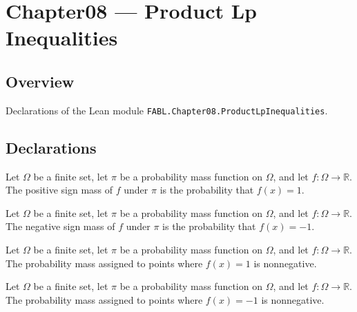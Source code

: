 \chapter{Chapter08 — Product Lp Inequalities}
\section{Overview}

Declarations of the Lean module \texttt{FABL.Chapter08.ProductLpInequalities}.

\section{Declarations}

\begin{definition}
\label{FABL.pmfSignPlusMass}
\leanok
{}
Let $Ω$ be a finite set, let $π$ be a probability mass function on $Ω$, and let
$f:Ω\to\mathbb R$. The positive sign mass of $f$ under $π$ is the probability that
$f(x)=1$.
\end{definition}

\begin{definition}
\label{FABL.pmfSignMinusMass}
\leanok
{}
Let $Ω$ be a finite set, let $π$ be a probability mass function on $Ω$, and let
$f:Ω\to\mathbb R$. The negative sign mass of $f$ under $π$ is the probability that
$f(x)=-1$.
\end{definition}

\begin{theorem}
\label{FABL.pmfSignPlusMass_nonneg}
\leanok
{}
Let $\Omega$ be a finite set, let $\pi$ be a probability mass function on $\Omega$, and
let $f:\Omega\to\mathbb{R}$. The probability mass assigned to points where $f(x)=1$ is
nonnegative.
\end{theorem}

\begin{theorem}
\label{FABL.pmfSignMinusMass_nonneg}
\leanok
{}
Let $\Omega$ be a finite set, let $\pi$ be a probability mass function on $\Omega$, and
let $f:\Omega\to\mathbb{R}$. The probability mass assigned to points where $f(x)=-1$ is
nonnegative.
\end{theorem}

